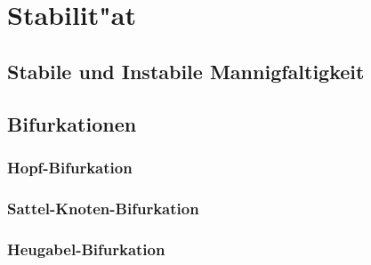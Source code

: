 %
%
%
\chapter{Stabilit"at\label{chapter:stabilitaet}}
\lhead{}

\section{Stabile und Instabile Mannigfaltigkeit}
\section{Bifurkationen}
\subsection{Hopf-Bifurkation}
\subsection{Sattel-Knoten-Bifurkation}
\subsection{Heugabel-Bifurkation}
